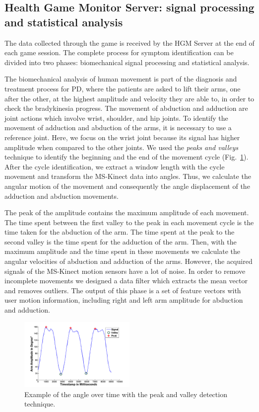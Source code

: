\documentclass[10pt, conference, compsocconf]{IEEEtran}
\begin{document}
\subsection{Health Game Monitor Server: signal processing and statistical analysis}

The data collected through the game is received by the HGM Server at the end of each game session. The complete process for symptom identification can be divided into two phases: biomechanical signal processing and statistical analysis. 

The biomechanical analysis of human movement is part of the diagnosis and treatment process for PD, where the patients are asked to lift their arms, one after the other, at the highest amplitude and velocity they are able to, in order to check the bradykinesia progress. The movement of abduction and adduction are joint actions which involve wrist, shoulder, and hip joints. To identify the movement of adduction and abduction of the arms, it is necessary to use a reference joint. Here, we focus on the wrist joint because its signal has higher amplitude when compared to the other joints. We used the \textit{peaks and valleys} technique to identify the beginning and the end of the movement cycle (Fig.~\ref{fig:signalamplitudepeakvaley}). After the cycle identification, we extract a window length with the cycle movement and transform the MS-Kinect data into angles. Thus, we calculate the angular motion of the movement and consequently the angle displacement of the adduction and abduction movements.

The peak of the amplitude contains the maximum amplitude of each movement. The time spent between the first valley to the peak in each movement cycle is the time taken for the abduction of the arm. The time spent at the peak to the second valley is the time spent for the adduction of the arm. Then, with the maximum amplitude and the time spent in these movements we calculate the angular velocities of abduction and adduction of the arms. However, the acquired signals of the MS-Kinect motion sensors have a lot of noise. In order to remove incomplete movements we designed a data filter which extracts the mean vector and removes outliers. The output of this phase is a set of feature vectors with user motion information, including right and left arm amplitude for abduction and adduction.

\begin{figure}[!htb]
	\centering
	\includegraphics[width=0.5\textwidth]{img/signalamplitudepeakvaley-2.png}
	\caption{Example of the angle over time with the peak and valley detection technique.}
	\label{fig:signalamplitudepeakvaley}
\end{figure}
\end{document}
